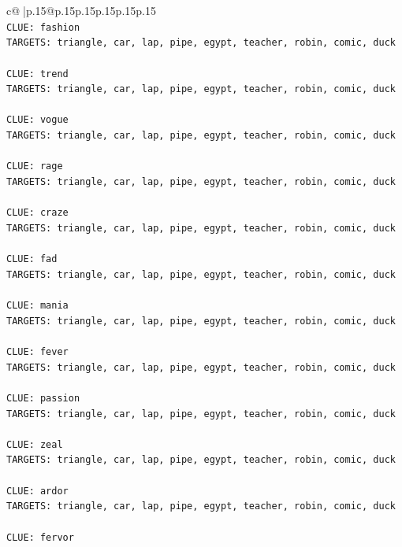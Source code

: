 \documentclass{article}
\begin{document}
{\begin{supertabular}{c@{$\;$}|p{.15\linewidth}@{}p{.15\linewidth}p{.15\linewidth}p{.15\linewidth}p{.15\linewidth}p{.15\linewidth}}
{{{\\ 
\texttt{CLUE: fashion} \\
\texttt{TARGETS: triangle, car, lap, pipe, egypt, teacher, robin, comic, duck} \\
\\ 
\texttt{CLUE: trend} \\
\texttt{TARGETS: triangle, car, lap, pipe, egypt, teacher, robin, comic, duck} \\
\\ 
\texttt{CLUE: vogue} \\
\texttt{TARGETS: triangle, car, lap, pipe, egypt, teacher, robin, comic, duck} \\
\\ 
\texttt{CLUE: rage} \\
\texttt{TARGETS: triangle, car, lap, pipe, egypt, teacher, robin, comic, duck} \\
\\ 
\texttt{CLUE: craze} \\
\texttt{TARGETS: triangle, car, lap, pipe, egypt, teacher, robin, comic, duck} \\
\\ 
\texttt{CLUE: fad} \\
\texttt{TARGETS: triangle, car, lap, pipe, egypt, teacher, robin, comic, duck} \\
\\ 
\texttt{CLUE: mania} \\
\texttt{TARGETS: triangle, car, lap, pipe, egypt, teacher, robin, comic, duck} \\
\\ 
\texttt{CLUE: fever} \\
\texttt{TARGETS: triangle, car, lap, pipe, egypt, teacher, robin, comic, duck} \\
\\ 
\texttt{CLUE: passion} \\
\texttt{TARGETS: triangle, car, lap, pipe, egypt, teacher, robin, comic, duck} \\
\\ 
\texttt{CLUE: zeal} \\
\texttt{TARGETS: triangle, car, lap, pipe, egypt, teacher, robin, comic, duck} \\
\\ 
\texttt{CLUE: ardor} \\
\texttt{TARGETS: triangle, car, lap, pipe, egypt, teacher, robin, comic, duck} \\
\\ 
\texttt{CLUE: fervor} \\
}}}
\end{supertabular}}
\end{document}
